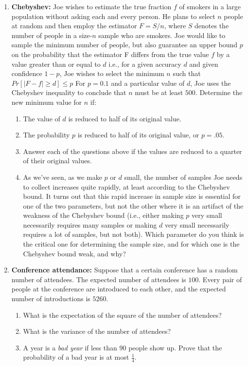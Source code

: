 \documentclass[11pt,fleqn]{article}
\begin{document}
\begin{enumerate}
\item \textbf{Chebyshev:}
Joe wishes to estimate the true fraction $f$ of smokers in a large population without asking each
and every person. He plans to select $n$ people at random and then employ the estimator $F = S/n$,
where $S$ denotes the number of people in a size-$n$ sample who are smokers. Joe would like to sample
the minimum number of people, but also guarantee an upper bound $p$ on the probability that the
estimator F differs from the true value $f$ by a value greater than or equal to $d$ i.e., for a given
accuracy $d$ and given confidence $1-p$, Joe wishes to select the minimum $n$ such that
$Pr[|F - f| \geq d] \leq p$
For $p = 0.1$ and a particular value of $d$, Joe uses the Chebyshev inequality to conclude that $n$
must be at least $500$. Determine the new minimum value for $n$ if:
\begin{enumerate}
\item The value of $d$ is reduced to half of its original value.
\item The probability $p$ is reduced to half of its original value, or $p = .05$.
\item Answer each of the questions above if the values are reduced to a quarter of their original values. 
\item As we've seen, as we make $p$ or $d$ small, the number of samples Joe needs to collect increases quite rapidly, at least according to the Chebyshev bound. It turns out that this rapid increase in sample size is essential for one of the two parameters, but not the other where it is an artifact of the weakness of the Chebyshev bound (i.e., either making $p$ very small necessarily requires many samples or making $d$ very small necessarily requires a lot of samples, but not both). Which parameter do you think is the critical one for determining the sample size, and for which one is the Chebyshev bound weak, and why?
\end{enumerate}

\item \textbf{Conference attendance:}
Suppose that a certain conference
has a random number of attendees.
The expected number of attendees is $100$.
Every pair of people at the conference are introduced
to each other, and the expected number of introductions
is $5260$.

\begin{enumerate}
\item What is the expectation of the square of the number of attendees?
\item What is the variance of the number of attendees?
\item A year is a \emph{bad year} if less than $90$ people show up.
Prove that the probability of a bad year is at most $\frac 14$.
\end{enumerate}


\end{enumerate}
\end{document}
